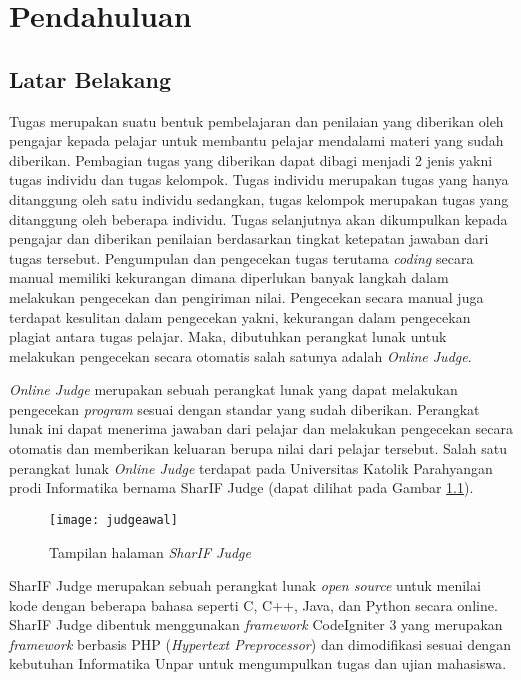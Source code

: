 \chapter{Pendahuluan}
\label{chap:intro}
   
\section{Latar Belakang}
\label{sec:label}

Tugas merupakan suatu bentuk pembelajaran dan penilaian yang diberikan oleh pengajar kepada pelajar untuk membantu pelajar mendalami materi yang sudah diberikan\cite{prihatini:16:plagiarisme}. Pembagian tugas yang diberikan dapat dibagi menjadi 2 jenis yakni tugas individu dan tugas kelompok. Tugas individu merupakan tugas yang hanya ditanggung oleh satu individu sedangkan, tugas kelompok merupakan tugas yang ditanggung oleh beberapa individu. Tugas selanjutnya akan dikumpulkan kepada pengajar dan diberikan penilaian berdasarkan tingkat ketepatan jawaban dari tugas tersebut. Pengumpulan dan pengecekan tugas terutama \textit{coding} secara manual memiliki kekurangan dimana diperlukan banyak langkah dalam melakukan pengecekan dan pengiriman nilai. Pengecekan secara manual juga terdapat kesulitan dalam pengecekan yakni, kekurangan dalam pengecekan plagiat antara tugas pelajar. Maka, dibutuhkan perangkat lunak untuk melakukan pengecekan secara otomatis salah satunya adalah \textit{Online Judge}.

\textit{Online Judge} merupakan sebuah perangkat lunak yang dapat melakukan pengecekan \textit{program} sesuai dengan standar yang sudah diberikan. Perangkat lunak ini dapat menerima jawaban dari pelajar dan melakukan pengecekan secara otomatis dan memberikan keluaran berupa nilai dari pelajar tersebut\cite{kurnia:01:judge}. Salah satu perangkat lunak \textit{Online Judge} terdapat pada Universitas Katolik Parahyangan prodi Informatika bernama SharIF Judge (dapat dilihat pada Gambar \ref{fig:judgeawal}). 

\begin{figure}[H]
	\centering  
	\texttt{[image: judgeawal]}  
	\caption[Tampilan halaman \textit{SharIF Judge}]{Tampilan halaman \textit{SharIF Judge}} 
	\label{fig:judgeawal} 
\end{figure} 


SharIF Judge merupakan sebuah perangkat lunak \textit{open source} untuk menilai kode dengan beberapa bahasa seperti C, C++, Java, dan Python secara online. SharIF Judge dibentuk menggunakan \textit{framework} CodeIgniter 3 yang merupakan \textit{framework} berbasis PHP (\textit{Hypertext Preprocessor}) dan dimodifikasi sesuai dengan kebutuhan Informatika Unpar untuk mengumpulkan tugas dan ujian mahasiswa\cite{sharif:23}.

